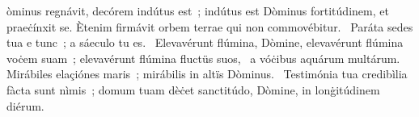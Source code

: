 \psalmChapterWithInscription{}
{ }
{%
òminus regnávit, decórem indútus est~; indútus est Dòminus fortitúdinem, et praeċínxit se. Ètenim firmávit orbem terrae qui non commovébitur. 
~Paráta sedes tua e tunc~; a sáeculo tu es. 
~Elevavérunt flúmina, Dòmine, elevavérunt flúmina voċem suam~; elevavérunt flúmina fluctüs suos, 
~a vóċibus aquárum multárum. Mirábiles elaçiónes maris~; mirábilis in altïs Dòminus. 
~Testimónia tua credibìlia fàcta sunt nìmis~; domum tuam dèċet sanctitúdo, Dòmine, in lonġitúdinem diérum. 
}
